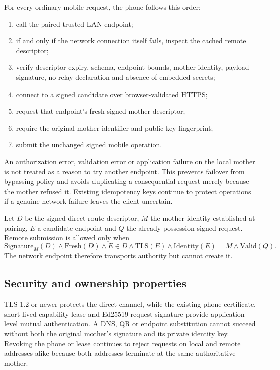 For every ordinary mobile request, the phone follows this order:
\begin{enumerate}
  \item call the paired trusted-LAN endpoint;
  \item if and only if the network connection itself fails, inspect the cached remote
        descriptor;
  \item verify descriptor expiry, schema, endpoint bounds, mother identity, payload
        signature, no-relay declaration and absence of embedded secrets;
  \item connect to a signed candidate over browser-validated HTTPS;
  \item request that endpoint's fresh signed mother descriptor;
  \item require the original mother identifier and public-key fingerprint;
  \item submit the unchanged signed mobile operation.
\end{enumerate}

An authorization error, validation error or application failure on the local mother is
not treated as a reason to try another endpoint.  This prevents failover from bypassing
policy and avoids duplicating a consequential request merely because the mother refused
it.  Existing idempotency keys continue to protect operations if a genuine network
failure leaves the client uncertain.

Let $D$ be the signed direct-route descriptor, $M$ the mother identity established at
pairing, $E$ a candidate endpoint and $Q$ the already possession-signed request.  Remote
submission is allowed only when
\[
  \mathrm{Signature}_{M}(D) \land \mathrm{Fresh}(D) \land E\in D
  \land \mathrm{TLS}(E) \land \mathrm{Identity}(E)=M \land \mathrm{Valid}(Q).
\]
The network endpoint therefore transports authority but cannot create it.

\subsection{Security and ownership properties}

TLS 1.2 or newer protects the direct channel, while the existing phone certificate,
short-lived capability lease and Ed25519 request signature provide application-level
mutual authentication.  A DNS, QR or endpoint substitution cannot succeed without both
the original mother's signature and its private identity key.  Revoking the phone or
lease continues to reject requests on local and remote addresses alike because both
addresses terminate at the same authoritative mother.

